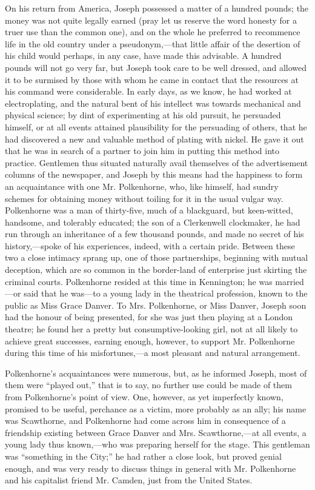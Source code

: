 On his return from America, Joseph possessed a matter of a hundred
pounds; the money was not quite legally earned (pray let us reserve the
word honesty for a truer use than the common one), and on the whole he
preferred to recommence life in the old country under a
pseudonym,---that little affair {}of the desertion of his child would
perhaps, in any case, have made this advisable. A hundred pounds will
not go very far, but Joseph took care to be well dressed, and allowed it
to be surmised by those with whom he came in contact that the resources
at his command were considerable. In early days, as we know, he had
worked at electroplating, and the natural bent of his intellect was
towards mechanical and physical science; by dint of experimenting at his
old pursuit, he persuaded himself, or at all events attained
plausibility for the persuading of others, that he had discovered a new
and valuable method of plating with nickel. He gave it out that he was
in search of a partner to join him in putting this method into practice.
Gentlemen thus situated naturally avail themselves of the advertisement
columns of the newspaper, and Joseph by this means had the happiness to
form an acquaintance with one Mr. Polkenhorne, who, like himself, had
sundry schemes for obtaining money without toiling for it in the usual
vulgar way. {}Polkenhorne was a man of thirty-five, much of a
blackguard, but keen-witted, handsome, and tolerably educated; the son
of a Clerkenwell clockmaker, he had run through an inheritance of a few
thousand pounds, and made no secret of his history,---spoke of his
experiences, indeed, with a certain pride. Between these two a close
intimacy sprang up, one of those partnerships, beginning with mutual
deception, which are so common in the border-land of enterprise just
skirting the criminal courts. Polkenhorne resided at this time in
Kennington; he was married---or said that he was---to a young lady in
the theatrical profession, known to the public as Miss Grace Danver. To
Mrs. Polkenhorne, or Miss Danver, Joseph soon had the honour of being
presented, for she was just then playing at a London theatre; he found
her a pretty but consumptive-looking girl, not at all likely to achieve
great successes, earning enough, however, to support Mr. Polkenhorne
during this time of his misfortunes,---a most pleasant and natural
arrangement.

{}Polkenhorne's acquaintances were numerous, but, as he informed Joseph,
most of them were ``played out,'' that is to say, no further use could
be made of them from Polkenhorne's point of view. One, however, as yet
imperfectly known, promised to be useful, perchance as a victim, more
probably as an ally; his name was Scawthorne, and Polkenhorne had come
across him in consequence of a friendship existing between Grace Danver
and Mrs. Scawthorne,---at all events, a young lady thus known,---who was
preparing herself for the stage. This gentleman was ``something in the
City;'' he had rather a close look, but proved genial enough, and was
very ready to discuss things in general with Mr. Polkenhorne and his
capitalist friend Mr. Camden, just from the United States.

